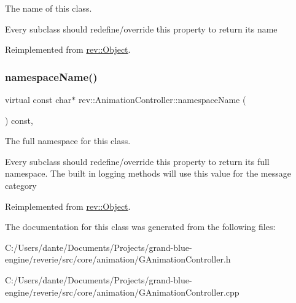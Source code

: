 The name of this class. 

Every subclass should redefine/override this property to return its name 

Reimplemented from \mbox{\hyperlink{classrev_1_1_object_a7a2013f91169479b65cf93afdc5d9a68}{rev\+::\+Object}}.

\mbox{\label{classrev_1_1_animation_controller_aa20837e4b8c3730c3a66bc84e2524b02}} 
\subsubsection{\texorpdfstring{namespaceName()}{namespaceName()}}
{\footnotesize\ttfamily virtual const char$\ast$ rev\+::\+Animation\+Controller\+::namespace\+Name (\begin{DoxyParamCaption}{ }\end{DoxyParamCaption}) const\hspace{0.3cm}{\ttfamily [inline]}, {\ttfamily [virtual]}}



The full namespace for this class. 

Every subclass should redefine/override this property to return its full namespace. The built in logging methods will use this value for the message category 

Reimplemented from \mbox{\hyperlink{classrev_1_1_object_aaeb638d3e10f361c56c211a318a27f3d}{rev\+::\+Object}}.



The documentation for this class was generated from the following files\+:\begin{DoxyCompactItemize}
\item 
C\+:/\+Users/dante/\+Documents/\+Projects/grand-\/blue-\/engine/reverie/src/core/animation/G\+Animation\+Controller.\+h\item 
C\+:/\+Users/dante/\+Documents/\+Projects/grand-\/blue-\/engine/reverie/src/core/animation/G\+Animation\+Controller.\+cpp\end{DoxyCompactItemize}
